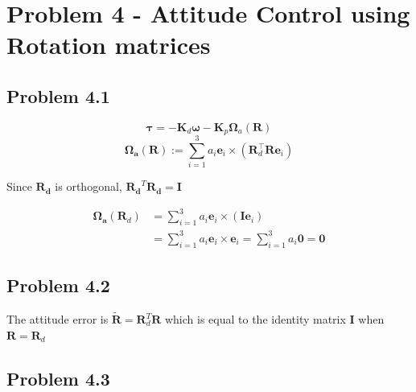 \section*{Problem 4 - Attitude Control using Rotation matrices}

 
\subsection*{Problem 4.1}
\begin{equation}
    \boldsymbol{\tau}=-\boldsymbol{K}_d\boldsymbol{\omega} - \boldsymbol{K}_p\boldsymbol{\Omega}_a(\boldsymbol{R})
\end{equation}
\begin{equation}
\boldsymbol{\Omega}_{\boldsymbol{a}}(\boldsymbol{R}) := \sum \limits_{i=1}^3 a_i \boldsymbol{e}_i \times (\boldsymbol{R}_d^{\top} \boldsymbol{R} \boldsymbol{e}_i)
\end{equation} 

Since $\boldsymbol{R_d}$ is orthogonal, $\boldsymbol{R_d}^T\boldsymbol{R_d}=\boldsymbol{I}$
\begin{subequation}
\begin{align}
\boldsymbol{\Omega}_{\boldsymbol{a}}(\boldsymbol{R}_d) &=  \sum \limits_{i=1}^3 a_i \boldsymbol{e}_i \times (\boldsymbol{I} \boldsymbol{e}_i)\\
&= \sum \limits_{i=1}^3 a_i \boldsymbol{e}_i \times \boldsymbol{e}_i
= \sum \limits_{i=1}^3 a_i\boldsymbol{0}
= \boldsymbol{0}
\end{align}
\end{subequation}
\subsection*{Problem 4.2}
The attitude error is $\boldsymbol{\tilde{R}}=\boldsymbol{R}_d^T\boldsymbol{R}$ which is equal to the identity matrix $\boldsymbol{I}$ when $\boldsymbol{R}=\boldsymbol{R}_d$
\subsection*{Problem 4.3}

